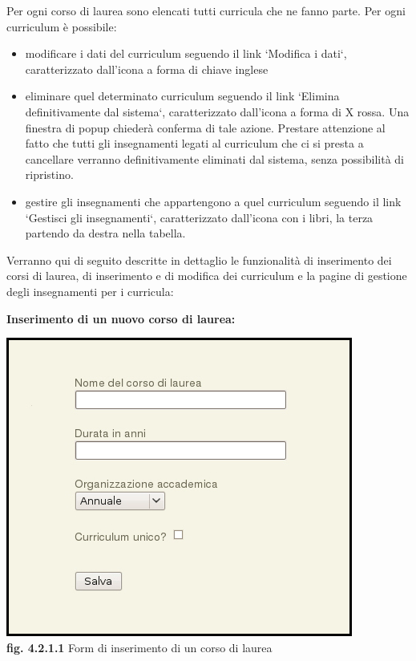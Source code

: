 \documentclass[11pt,a4paper]{article}
\begin{document}
Per ogni corso di laurea sono elencati tutti curricula che ne fanno parte.
Per ogni curriculum è possibile:
\begin{itemize}
 \item modificare i dati del curriculum seguendo il link `Modifica i dati`, caratterizzato dall'icona a forma di chiave inglese
 \item eliminare quel determinato curriculum seguendo il link `Elimina definitivamente dal sistema`, caratterizzato dall'icona a forma di X rossa. Una finestra di popup chiederà conferma di tale azione. Prestare attenzione al fatto che tutti gli insegnamenti legati al curriculum che ci si presta a cancellare verranno definitivamente eliminati dal sistema, senza possibilità di ripristino.
 \item gestire gli insegnamenti che appartengono a quel curriculum seguendo il link `Gestisci gli insegnamenti`, caratterizzato dall'icona con i libri, la terza partendo da destra nella tabella.
\end{itemize}

Verranno qui di seguito descritte in dettaglio le funzionalità di inserimento dei corsi di laurea, di inserimento e di modifica dei curriculum e la pagine di gestione degli insegnamenti per i curricula:
\newline \newline
\begin{large}\textbf{Inserimento di un nuovo corso di laurea:}\end{large}

\bigskip
\begin{center}
	\includegraphics[scale=0.5]{images/nuovo_corso.jpg}\\
	\textbf{fig. 4.2.1.1} Form di inserimento di un corso di laurea\\
\end{center}
\bigskip
\end{document}
